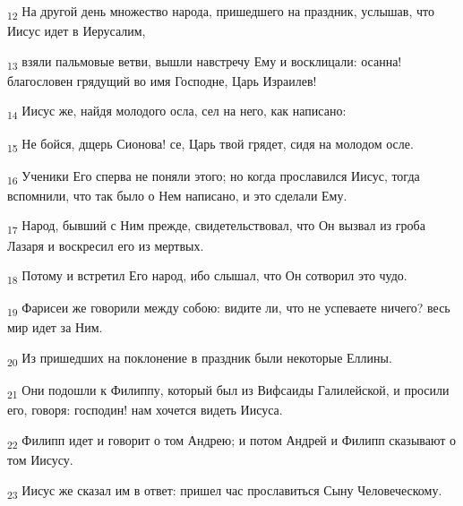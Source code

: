 \begin{tcolorbox}
\textsubscript{12} На другой день множество народа, пришедшего на праздник, услышав, что Иисус идет в Иерусалим,
\end{tcolorbox}
\begin{tcolorbox}
\textsubscript{13} взяли пальмовые ветви, вышли навстречу Ему и восклицали: осанна! благословен грядущий во имя Господне, Царь Израилев!
\end{tcolorbox}
\begin{tcolorbox}
\textsubscript{14} Иисус же, найдя молодого осла, сел на него, как написано:
\end{tcolorbox}
\begin{tcolorbox}
\textsubscript{15} Не бойся, дщерь Сионова! се, Царь твой грядет, сидя на молодом осле.
\end{tcolorbox}
\begin{tcolorbox}
\textsubscript{16} Ученики Его сперва не поняли этого; но когда прославился Иисус, тогда вспомнили, что так было о Нем написано, и это сделали Ему.
\end{tcolorbox}
\begin{tcolorbox}
\textsubscript{17} Народ, бывший с Ним прежде, свидетельствовал, что Он вызвал из гроба Лазаря и воскресил его из мертвых.
\end{tcolorbox}
\begin{tcolorbox}
\textsubscript{18} Потому и встретил Его народ, ибо слышал, что Он сотворил это чудо.
\end{tcolorbox}
\begin{tcolorbox}
\textsubscript{19} Фарисеи же говорили между собою: видите ли, что не успеваете ничего? весь мир идет за Ним.
\end{tcolorbox}
\begin{tcolorbox}
\textsubscript{20} Из пришедших на поклонение в праздник были некоторые Еллины.
\end{tcolorbox}
\begin{tcolorbox}
\textsubscript{21} Они подошли к Филиппу, который был из Вифсаиды Галилейской, и просили его, говоря: господин! нам хочется видеть Иисуса.
\end{tcolorbox}
\begin{tcolorbox}
\textsubscript{22} Филипп идет и говорит о том Андрею; и потом Андрей и Филипп сказывают о том Иисусу.
\end{tcolorbox}
\begin{tcolorbox}
\textsubscript{23} Иисус же сказал им в ответ: пришел час прославиться Сыну Человеческому.
\end{tcolorbox}
